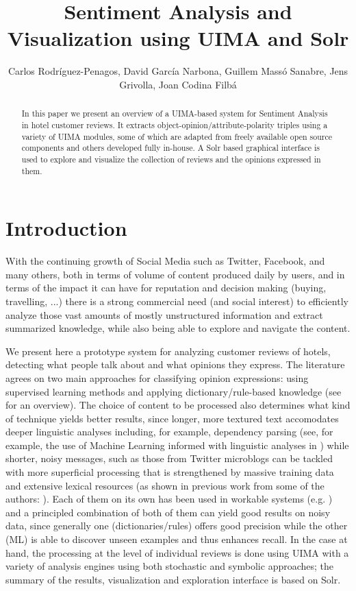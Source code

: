 \documentclass{llncs}
\title{Sentiment Analysis and Visualization using UIMA and Solr}
\author{Carlos Rodríguez-Penagos, David García Narbona, Guillem Massó Sanabre, Jens Grivolla, Joan Codina Filbá}
\institute{Barcelona Media Innovation Centre}
\begin{document}
\maketitle

\begin{abstract}
In this paper we present an overview of a UIMA-based system for Sentiment Analysis in hotel customer reviews. It extracts object-opinion/attribute-polarity triples using a variety of UIMA modules, some of which are adapted from freely available open source components and others developed fully in-house. A Solr based graphical interface is used to explore and visualize the collection of reviews and the opinions expressed in them.
\end{abstract}

\section{Introduction}

With the continuing growth of Social Media such as Twitter, Facebook, and many others, both in terms of volume of content produced daily by users, and in terms of the impact it can have for reputation and decision making (buying, travelling, ...) there is a strong commercial need (and social interest) to efficiently analyze those vast amounts of mostly unstructured information and extract summarized knowledge, while also being able to explore and navigate the content.

We present here a prototype system for analyzing customer reviews of hotels, detecting what people talk about and what opinions they express. The literature agrees on two main approaches for classifying opinion expressions: using supervised learning methods and applying dictionary/rule-based knowledge (see \cite{liu_sentiment_2012} for an overview). The choice of content to be processed also determines what kind of technique yields better results, since longer, more textured text accomodates deeper linguistic analyses including, for example, dependency parsing (see, for example, the use of Machine Learning informed with linguistic analyses in \cite{wilson_recognizing_2010}) while shorter, noisy messages, such as those from Twitter microblogs can be tackled with more superficial processing that is strengthened by massive training data and extensive lexical resources (as shown in previous work from some of the authors: \cite{chenlo_fbm-yahoo!_2012,rodriguez-penagos_fbm:_2013}). Each of them on its own has been used in workable systems (e.g. \cite{zhang_combining_2011}) and a principled combination of both of them can yield good results on noisy data, since generally one (dictionaries/rules) offers good precision while the other (ML) is able to discover unseen examples and thus enhances recall. In the case at hand, the processing at the level of individual reviews is done using UIMA with a variety of analysis engines using both stochastic and symbolic approaches; the summary of the results, visualization and exploration interface is based on Solr.
\end{document}
